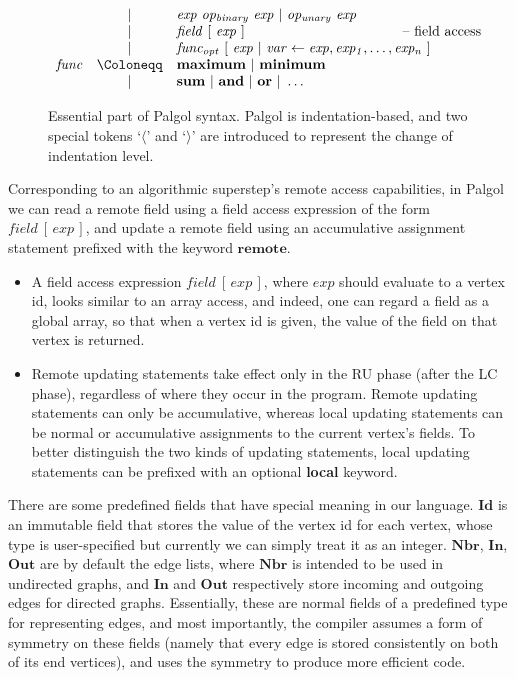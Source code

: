 \documentclass{sokendai_thesis} %
\newcommand{\hsp}[1]{\hspace{-3em}\hbox{#1}}
\begin{document}
\begin{figure}[t]
\[\begin{array}{lclr}
 & | & \mathit{exp}~\mathit{op_{binary}}~\mathit{exp}~|~\mathit{op_{unary}}~\mathit{exp} \\
 & | & \mathit{field}~[~\mathit{exp}~] & \hsp{-- field access} \\
 & | & \mathit{func_{opt}}~[~\mathit{exp}~|~\mathit{var}\leftarrow\mathit{exp},\mathit{exp_1},\ldots,\mathit{exp_n}~] \\
\mathit{func}  & \Coloneqq & \mathbf{maximum}~|~\mathbf{minimum} \\
 & | & \mathbf{sum}~|~\mathbf{and}~|~\mathbf{or}~|~\ldots \\
 \end{array}
\]
\caption{Essential part of Palgol syntax. Palgol is indentation-based, and two special tokens `$\langle$' and `$\rangle$' are introduced to represent the change of indentation level.}
\label{fig:syntax-simplified}
\vspace{-2ex}
\end{figure}

Corresponding to an algorithmic superstep's remote access capabilities, in Palgol we can read a remote field using a field access expression of the form $\mathit{field}~[\,\mathit{exp}\,]$, and update a remote field using an accumulative assignment statement prefixed with the keyword $\mathbf{remote}$.
\begin{itemize}\setlength\itemsep{0em}
\item A field access expression $\mathit{field}~[\,\mathit{exp}\,]$, where $\mathit{exp}$ should evaluate to a vertex id, looks similar to an array access, and indeed, one can regard a field as a global array, so that when a vertex id is given, the value of the field on that vertex is returned.
\item Remote updating statements take effect only in the RU phase (after the LC phase), regardless of where they occur in the program.
Remote updating statements can only be accumulative, whereas local updating statements can be normal or accumulative assignments to the current vertex's fields.
To better distinguish the two kinds of updating statements, local updating statements can be prefixed with an optional \textbf{local} keyword.
\end{itemize}

There are some predefined fields that have special meaning in our language.
$\mathbf{Id}$ is an immutable field that stores the value of the vertex id for each vertex, whose type is user-specified but currently we can simply treat it as an integer.
$\mathbf{Nbr}$, $\mathbf{In}$, $\mathbf{Out}$ are by default the edge lists, where $\mathbf{Nbr}$ is intended to be used in undirected graphs, and $\mathbf{In}$ and $\mathbf{Out}$ respectively store incoming and outgoing edges for directed graphs.
Essentially, these are normal fields of a predefined type for representing edges, and most importantly, the compiler assumes a form of symmetry on these fields (namely that every edge is stored consistently on both of its end vertices), and uses the symmetry to produce more efficient code.
\end{document}
